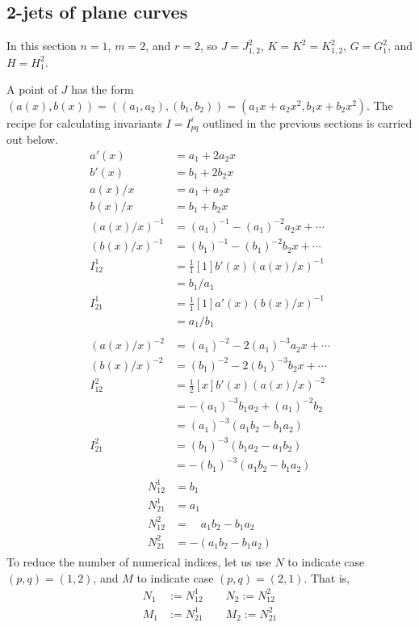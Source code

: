 \documentclass[12pt]{article}
\numberwithin{equation}{section}
\theoremstyle{plain}
\theoremstyle{definition}
\begin{document}
\subsection{2-jets of plane curves}\label{2jetsof}

In this section $n=1$, $m=2$, and $r=2$, so $J=J^{2}_{1,2}$, $K=K^{2}=K^{2}_{1,2}$, $G=G^{2}_{1}$, and $H=H^{2}_{1}$.

A point of $J$ has the form $(a(x),b(x))=((a_1,a_2),(b_1,b_2))=(a_1x+a_2x^2,b_1x+b_2x^2)$. The recipe for calculating invariants $I=I_{pq}^{i}$ outlined in the previous sections is carried out below.
\begin{align*}
a'(x)&=a_{1}+2a_{2}x\\
b'(x)&=b_{1}+2b_{2}x\\
a(x)/x&=a_{1}+a_{2}x\\
b(x)/x&=b_{1}+b_{2}x\\
(a(x)/x)^{-1}&=(a_{1})^{-1}-(a_{1})^{-2}a_{2}x+\cdots\\
(b(x)/x)^{-1}&=(b_{1})^{-1}-(b_{1})^{-2}b_{2}x+\cdots\\
I_{12}^1&=\tfrac{1}{1}[1]b'(x)(a(x)/x)^{-1}\\
&= b_{1}/a_{1} \\
I_{21}^1&=\tfrac{1}{1}[1]a'(x)(b(x)/x)^{-1}\\
&= a_{1}/b_{1}\\
&\quad\\
(a(x)/x)^{-2}&=(a_{1})^{-2}-2(a_{1})^{-3}a_{2}x+\cdots\\
(b(x)/x)^{-2}&=(b_{1})^{-2}-2(b_{1})^{-3}b_{2}x+\cdots\\
I_{12}^2&=\tfrac{1}{2}[x]b'(x)(a(x)/x)^{-2}  \\
 &=-(a_{1})^{-3}b_{1}a_{2}+(a_{1})^{-2}b_{2}\\
 &=(a_{1})^{-3}(a_{1}b_{2}-b_{1}a_{2})\\
I_{21}^2&=(b_{1})^{-3}(b_{1}a_{2}-a_{1}b_{2})\\
 &=-(b_{1})^{-3}(a_{1}b_{2}-b_{1}a_{2})
\end{align*}
\begin{align}\label{mappingToModH}
\begin{split}
N_{12}^1 &= b_{1}\\
N_{21}^1 &= a_{1}\\
N_{12}^2 &= \quad a_{1}b_{2}-b_{1}a_{2}\\
N_{21}^2 &= -(a_{1}b_{2}-b_{1}a_{2})
\end{split}
\end{align}
To reduce the number of numerical indices, let us use $N$ to indicate case $(p,q)=(1,2)$, and $M$ to indicate case $(p,q)=(2,1)$. That is,
\begin{align*}
N_{1} &:= N_{12}^{1}\qquad  N_{2} := N_{12}^2\\
M_{1} &:= N_{21}^{1}\qquad  M_{2} := N_{21}^2
\end{align*}
\end{document}
